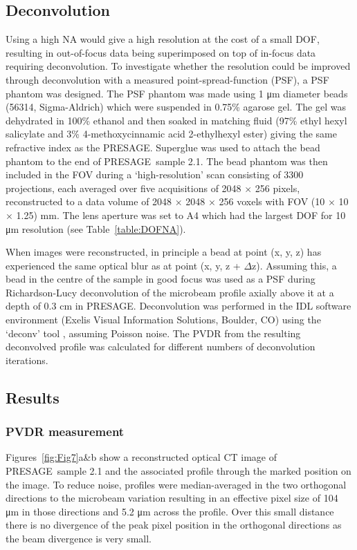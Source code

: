 	\subsection{Deconvolution}
	Using a high NA would give a high resolution at the cost of a small DOF, resulting in out-of-focus data being superimposed on top of in-focus data requiring deconvolution. To investigate whether the resolution could be improved through deconvolution with a measured point-spread-function (PSF), a PSF phantom was designed. The PSF phantom was made using 1 \si{\um} diameter beads (56314, Sigma-Aldrich) which were suspended in 0.75\% agarose gel. The gel was dehydrated in 100\% ethanol and then soaked in matching fluid (97\% ethyl hexyl salicylate and 3\% 4-methoxycinnamic acid 2-ethylhexyl ester) giving the same refractive index as the PRESAGE\textregistered. Superglue was used to attach the bead phantom to the end of PRESAGE\textregistered \ sample 2.1. The bead phantom was then included in the FOV during a `high-resolution' scan consisting of 3300 projections, each averaged over five acquisitions of 2048 $\times$ 256 pixels, reconstructed to a data volume of 2048 $\times$ 2048 $\times$ 256 voxels with FOV (10 $\times$ 10 $\times$ 1.25) mm. The lens aperture was set to A4  which had the largest DOF for 10 \si{\um} resolution (see Table~\ref{table:DOFNA}). 
	
	When images were reconstructed, in principle a bead at point (x, y, z) has experienced the same optical blur as at point (x, y, z + $\Delta $z). Assuming this, a bead in the centre of the sample in good focus was used as a PSF during Richardson-Lucy deconvolution of the microbeam profile axially above it at a depth of 0.3 cm in PRESAGE\textregistered. Deconvolution was performed in the IDL software environment (Exelis Visual Information Solutions, Boulder, CO) using the `deconv' tool \cite{varosi1993idl}, assuming Poisson noise. The PVDR from the resulting deconvolved profile was calculated for different numbers of deconvolution iterations.
	
	\subsection{Results}

	
	\subsubsection{PVDR measurement} 
	Figures~\ref{fig:Fig7}a\&b show a reconstructed optical CT image of PRESAGE\textregistered \ sample 2.1 and the associated profile through the marked position on the image. To reduce noise, profiles were median-averaged in the two orthogonal directions to the microbeam variation resulting in an effective pixel size of 104 \si{\um} in those directions and 5.2 \si{\um} across the profile. Over this small distance there is no divergence of the peak pixel position in the orthogonal directions as the beam divergence is very small. 
	

